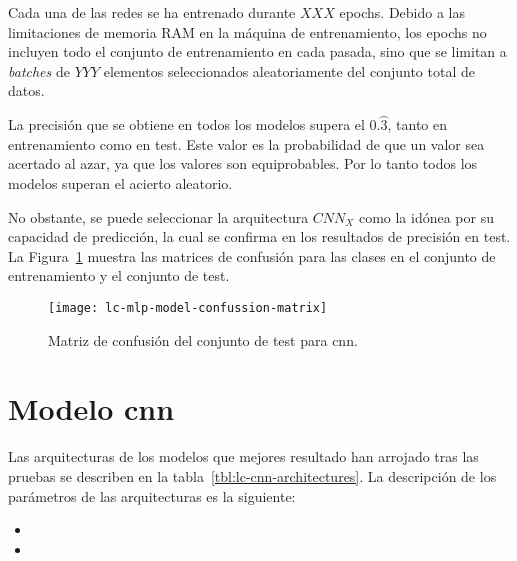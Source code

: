 Cada una de las redes se ha entrenado durante $XXX$ epochs. Debido a las limitaciones de memoria RAM en la máquina de entrenamiento, los epochs no incluyen todo el conjunto de entrenamiento en cada pasada, sino que se limitan a \textit{batches} de $YYY$ elementos seleccionados aleatoriamente del conjunto total de datos.

La precisión que se obtiene en todos los modelos supera el $0.\wideparen{3}$, tanto en entrenamiento como en test. Este valor es la probabilidad de que un valor sea acertado al azar, ya que los valores son equiprobables. Por lo tanto todos los modelos superan el acierto aleatorio.


No obstante, se puede seleccionar la arquitectura $CNN_X$ como la idónea por su capacidad de predicción, la cual se confirma en los resultados de precisión en test. La Figura~\ref{fig:lc-mlp-model-confussion-matrix} muestra las matrices de confusión para las clases en el conjunto de entrenamiento y el conjunto de test.

\begin{figure}
	\centering
	\texttt{[image: lc-mlp-model-confussion-matrix]}
	\caption[Matriz de confusión del conjunto de test para \ac{cnn}]{Matriz de confusión del conjunto de test para \ac{cnn}.}
	\label{fig:lc-mlp-model-confussion-matrix}
\end{figure}

\section{Modelo \ac{cnn}}

Las arquitecturas de los modelos que mejores resultado han arrojado tras las pruebas se describen en la tabla~\ref{tbl:lc-cnn-architectures}. La descripción de los parámetros de las arquitecturas es la siguiente:

\begin{itemize}
	\item {}
	\item {}
\end{itemize}

